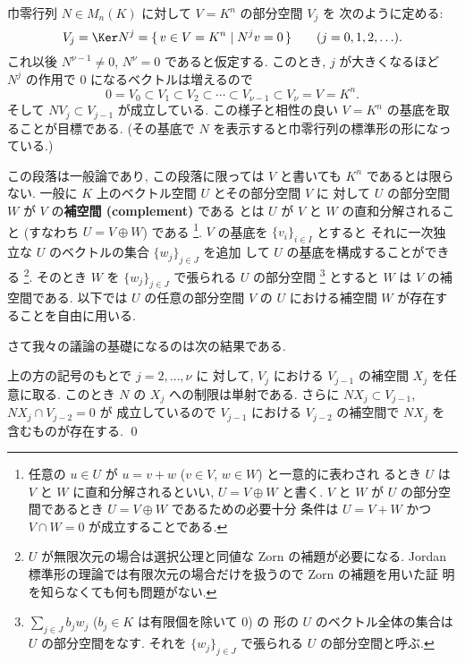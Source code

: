 \documentclass[12pt,twoside]{jarticle}
\begin{document}
巾零行列 $N\in M_n(K)$ に対して $V=K^n$ の部分空間 $V_j$ を
次のように定める:
\begin{equation*}
  V_j = \Ker N^j = \{\, v\in V=K^n \mid N^j v = 0 \,\}
  \qquad (j=0,1,2,\ldots).
\end{equation*}
これ以後 $N^{\nu-1}\ne 0$, $N^\nu=0$ であると仮定する.
このとき, $j$ が大きくなるほど $N^j$ の作用で $0$ になるベクトルは増えるので
\begin{equation*}
  0 = V_0 \subset V_1 \subset V_2 \subset 
      \cdots \subset V_{\nu-1} \subset V_\nu = V = K^n.
\end{equation*}
そして $NV_j \subset V_{j-1}$ が成立している.  
この様子と相性の良い $V=K^n$ の基底を取ることが目標である.
(その基底で $N$ を表示すると巾零行列の標準形の形になっている.)

\medskip

この段落は一般論であり, 
この段落に限っては $V$ と書いても $K^n$ であるとは限らない.
一般に $K$ 上のベクトル空間 $U$ とその部分空間 $V$ に
対して $U$ の部分空間 $W$ が $V$ の{\bf 補空間 (complement)} である
とは $U$ が $V$ と $W$ の直和分解されること
(すなわち $U=V\oplus W$) である%
\footnote{任意の $u\in U$ が $u=v+w$ ($v\in V$, $w\in W$) と一意的に表わされ
  るとき $U$ は $V$ と $W$ に直和分解されるといい, $U=V\oplus W$ と書く.
  $V$ と $W$ が $U$ の部分空間であるとき $U=V\oplus W$ であるための必要十分
  条件は $U=V+W$ かつ $V\cap W=0$ が成立することである.}.
$V$ の基底を $\{v_i\}_{i\in I}$ とすると
それに一次独立な $U$ のベクトルの集合 $\{w_j\}_{j\in J}$ を追加
して $U$ の基底を構成することができる%
\footnote{$U$ が無限次元の場合は選択公理と同値な Zorn の補題が必要になる.
  Jordan 標準形の理論では有限次元の場合だけを扱うので Zorn の補題を用いた証
  明を知らなくても何も問題がない.}.
そのとき $W$ を $\{w_j\}_{j\in J}$ で張られる $U$ の部分空間%
\footnote{$\sum_{j\in J} b_j w_j$  ($b_j\in K$ は有限個を除いて $0$) の
  形の $U$ のベクトル全体の集合は $U$ の部分空間をなす.  
  それを $\{w_j\}_{j\in J}$ で張られる $U$ の部分空間と呼ぶ.}%
とすると $W$ は $V$ の補空間である.  以下では $U$ の任意の部分空間 $V$ 
の $U$ における補空間 $W$ が存在することを自由に用いる.

\medskip

さて我々の議論の基礎になるのは次の結果である.

\begin{question}
\label{q:nilp-1}
  上の方の記号のもとで $j=2,\dots,\nu$ に
  対して, $V_j$ における $V_{j-1}$ の補空間 $X_j$ を任意に取る.
  このとき $N$ の $X_j$ への制限は単射である.
  さらに $NX_j\subset V_{j-1}$, $NX_j\cap V_{j-2}=0$ が
  成立しているので $V_{j-1}$ における $V_{j-2}$ の補空間で $NX_j$ を
  含むものが存在する. \qed
\end{question}
\end{document}
